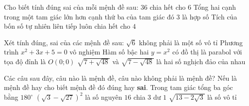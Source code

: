 \begin{ex}%
	Cho biết tính  đúng sai của mỗi mệnh đề sau:
	 \choiceTF
		{\True $36$ chia hết cho  $6$}
		{\True Tổng hai cạnh trong một tam  giác lớn hơn cạnh thứ ba của tam giác đó}
		{$3$  là hợp số}
		{\True Tích của bốn số tự  nhiên liên tiếp luôn chia hết cho $4$}
\end{ex}

\begin{ex}%
	Xét tính đúng, sai của các  mệnh đề sau:
	 \choiceTF
		{$\sqrt{6}$ không phải là một  số vô tỉ}
		{\True  Phương trình $x^2+3x+5=0$ vô nghiệm}
		{\True Hàm số bậc  hai $y=x^2$ có đồ thị là parabol với tọa độ đỉnh là $O(0;0)$}
		{\True $\sqrt{7+\sqrt{48}}$ và $\sqrt{7-\sqrt{48}}$ là hai số nghịch  đảo của nhau}
\end{ex}

\begin{ex}%
	 Các câu sau đây, câu nào là mệnh đề, câu nào không phải là mệnh đề? Nếu là mệnh đề hay cho biết mệnh đề đó đúng hay \textbf{sai}.
	 \choiceTF
		 {\True Trong tam giác tổng ba góc bằng $180^{\circ}$}
		{\True  $\left(\sqrt{3}-\sqrt{27} \right)^2$ là số nguyên}
		{\True  $16$ chia $3$ dư $1$}
		{\True $\sqrt{13-2\sqrt{3}}$  là số vô tỉ}
\end{ex}

